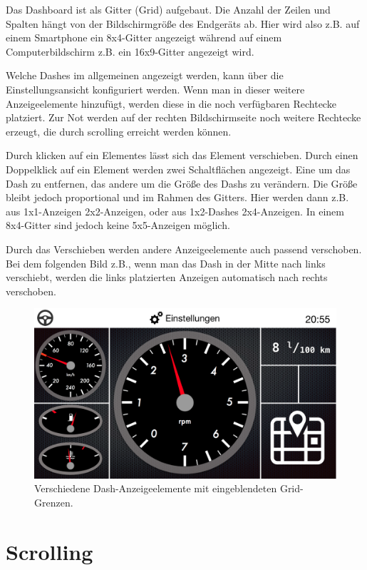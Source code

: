 \documentclass[pflichtenheft.tex]{subfiles}
\begin{document}
Das Dashboard ist als Gitter (Grid) aufgebaut. Die Anzahl der Zeilen und Spalten hängt von der Bildschirmgröße des Endgeräts ab. Hier wird also z.B. auf einem Smartphone ein 8x4-Gitter angezeigt während auf einem Computerbildschirm z.B. ein 16x9-Gitter angezeigt wird.

Welche Dashes im allgemeinen angezeigt werden, kann über die Einstellungsansicht konfiguriert werden. Wenn man in dieser weitere Anzeigeelemente hinzufügt, werden diese in die noch verfügbaren Rechtecke platziert. Zur Not werden auf der rechten Bildschirmseite noch weitere Rechtecke erzeugt, die durch scrolling erreicht werden können.

Durch klicken auf ein Elementes lässt sich das Element verschieben. Durch einen Doppelklick auf ein Element werden zwei Schaltflächen angezeigt. Eine um das Dash zu entfernen, das andere um die Größe des Dashs zu verändern. Die Größe bleibt jedoch proportional und im Rahmen des Gitters. Hier werden dann z.B. aus 1x1-Anzeigen 2x2-Anzeigen, oder aus 1x2-Dashes 2x4-Anzeigen. In einem 8x4-Gitter sind jedoch keine 5x5-Anzeigen möglich.

Durch das Verschieben werden andere Anzeigeelemente auch passend verschoben. Bei dem folgenden Bild z.B., wenn man das Dash in der Mitte nach links verschiebt, werden die links platzierten Anzeigen automatisch nach rechts verschoben.

\begin{figure}[H]
  	\begin{center}
 		\includegraphics[width=\textwidth]{Images/GUI-DashboardGrid2.png}
  		\caption{Verschiedene Dash-Anzeigeelemente mit eingeblendeten Grid-Grenzen.}
  	\end{center}
\end{figure}

\clearpage
\section{Scrolling}
\end{document}
